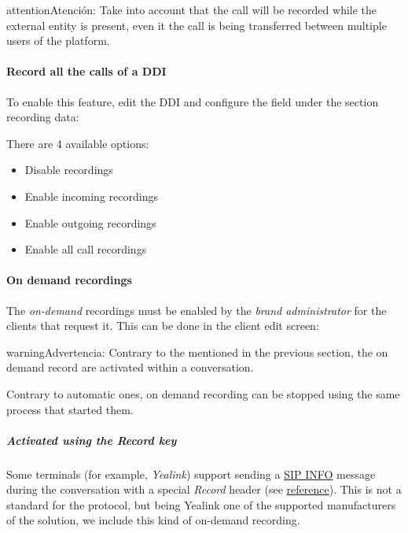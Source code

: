 \documentclass[letterpaper,10pt,spanish]{sphinxmanual}
\begin{document}
\begin{notice}{attention}{Atención:}
Take into account that the call will be recorded while the
external entity is present, even it the call is being transferred between
multiple users of the platform.
\end{notice}
\paragraph{Record all the calls of a DDI}

To enable this feature, edit the DDI and configure the field under the section
recording data:

There are 4 available options:
\begin{itemize}
\item {} 
Disable recordings

\item {} 
Enable incoming recordings

\item {} 
Enable outgoing recordings

\item {} 
Enable all call recordings

\end{itemize}


\paragraph{On demand recordings}
\label{administration_portal/client/vpbx/calls/call_recordings:on-demand-recordings}
The \emph{on-demand} recordings must be enabled by the \emph{brand administrator} for the
clients that request it. This can be done in the client edit screen:

\begin{notice}{warning}{Advertencia:}
Contrary to the {\hyperref[administration_portal/platform/services:services]{}} mentioned in the
previous section, the on demand record are activated within a conversation.
\end{notice}

Contrary to automatic ones, on demand recording can be stopped using the same
process that started them.


\subparagraph{Activated using the \emph{Record} key}
\label{administration_portal/client/vpbx/calls/call_recordings:activated-using-the-record-key}
Some terminals (for example, \emph{Yealink}) support sending a \href{https://tools.ietf.org/html/rfc6086}{SIP INFO} message during the conversation with a
special \emph{Record} header (see \href{http://www.yealink.com/Upload/document/UsingCallRecordingFeatureonYealinkPhones/UsingCallRecordingFeatureonYealinkSIPT2XPphonesRev\_610-20561729764.pdf}{reference}).
This is not a standard for the protocol, but being Yealink one of the supported
manufacturers of the solution, we include this kind of on-demand recording.
\end{document}
